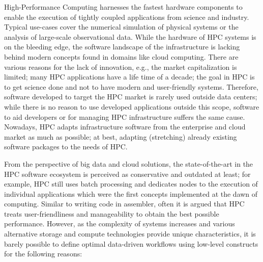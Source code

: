\documentclass[a4paper, twocolumn]{article}
\begin{document}
High-Performance Computing harnesses the fastest hardware components to enable
the execution of tightly coupled applications from science and industry.
Typical use-cases cover the numerical simulation of physical systems or the analysis of large-scale observational data.
While the hardware of HPC systems is on the bleeding edge, the software landscape of the infrastructure is lacking behind modern concepts found in domains like cloud computing.
There are various reasons for the lack of innovation, e.g., the market capitalization is limited; many HPC applications have a life time of a decade; the goal in HPC is to get science done and not to have modern and user-friendly systems.
Therefore, software developed to target the HPC market is rarely used outside data centers; while there is no reason to use developed applications outside this scope, software to aid developers or for managing HPC infrastructure suffers the same cause.
Nowadays, HPC adapts infrastructure software from the enterprise and cloud market as much as possible; at best, adapting (stretching) already existing software packages to the needs of HPC.

From the perspective of big data and cloud solutions, the state-of-the-art in the HPC software ecosystem is perceived as conservative and outdated at least; for example, HPC still uses batch processing and dedicates nodes to the execution of individual applications which were the first concepts implemented at the dawn of computing.
Similar to writing code in assembler, often it is argued that HPC treats user-friendliness and manageability to obtain the best possible performance.
However, as the complexity of systems increases and various alternative storage and compute technologies provide unique characteristics, it is barely possible to define optimal data-driven workflows using low-level constructs for the following reasons:
\end{document}
